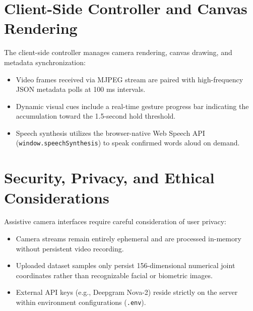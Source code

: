\section{Client-Side Controller and Canvas Rendering}
The client-side controller manages camera rendering, canvas drawing, and metadata synchronization:
\begin{itemize}
\item Video frames received via MJPEG stream are paired with high-frequency JSON metadata polls at 100 ms intervals.
\item Dynamic visual cues include a real-time gesture progress bar indicating the accumulation toward the 1.5-second hold threshold.
\item Speech synthesis utilizes the browser-native Web Speech API (\texttt{window.speechSynthesis}) to speak confirmed words aloud on demand.
\end{itemize}

\section{Security, Privacy, and Ethical Considerations}
Assistive camera interfaces require careful consideration of user privacy:
\begin{itemize}
\item Camera streams remain entirely ephemeral and are processed in-memory without persistent video recording.
\item Uploaded dataset samples only persist 156-dimensional numerical joint coordinates rather than recognizable facial or biometric images.
\item External API keys (e.g., Deepgram Nova-2) reside strictly on the server within environment configurations (\texttt{.env}).
\end{itemize}

